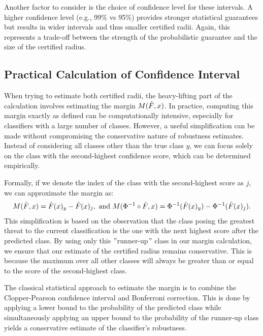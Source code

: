 Another factor to consider is the choice of confidence level for these intervals.
A higher confidence level (e.g., 99\% vs 95\%) provides stronger statistical guarantees but results in wider intervals and thus smaller certified radii.
Again, this represents a trade-off between the strength of the probabilistic guarantee and the size of the certified radius.

\subsection{Practical Calculation of Confidence Interval}\label{subsec:practical-calculation-of-confidence-interval}

When trying to estimate both certified radii, the heavy-lifting part of the calculation involves estimating the margin $M(\Hat{F},x)$.
In practice, computing this margin exactly as defined can be computationally intensive, especially for classifiers with a large number of classes.
However, a useful simplification can be made without compromising the conservative nature of robustness estimates.
Instead of considering all classes other than the true class $y$, we can focus solely on the class with the second-highest confidence score, which can be determined empirically.

Formally, if we denote the index of the class with the second-highest score as $j$, we can approximate the margin as:
\begin{align*}
    M(\Hat{F},x) =\Hat{F}(x)_{y} - \Hat{F}(x)_j, \text{ and }M(\Phi^{-1}\circ\Hat{F},x) =\Phi^{-1}(\Hat{F}(x)_{y}) - \Phi^{-1}(\Hat{F}(x)_j).
\end{align*}
This simplification is based on the observation that the class posing the greatest threat to the current classification is the one with the next highest score after the predicted class.
By using only this \("\)runner-up\("\) class in our margin calculation, we ensure that our estimate of the certified radius remains conservative.
This is because the maximum over all other classes will always be greater than or equal to the score of the second-highest class.

The classical statistical approach to estimate the margin is to combine the Clopper-Pearson confidence interval and Bonferroni correction.
This is done by applying a lower bound to the probability of the predicted class while simultaneously applying an upper bound to the probability of the runner-up class yields a conservative estimate of the classifier's robustness.

